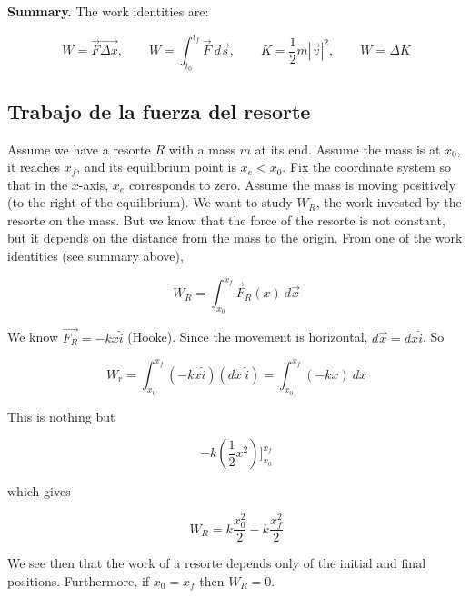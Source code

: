 \documentclass[12pt]{article}
\theoremstyle{definition}
\begin{document}
\begin{shaded}
    \textbf{Summary.} The work identities are:

    \begin{equation*}
        W = \vec{F} \vec{\Delta x}, \qquad W = \int_{t_0}^{t_f} \vec{F} ~ d\vec{s}, \qquad K = \frac{1}{2}m \left| \vec{v}
        \right|^2, \qquad W = \Delta K
    \end{equation*}
\end{shaded}

\subsection{Trabajo de la fuerza del resorte}

Assume we have a resorte $R$ with a mass $m$ at its end.  Assume the mass is at
$x_0$, it reaches $x_f$, and its equilibrium point is $x_e < x_0$. Fix the
coordinate system so that in the $x$-axis, $x_e$ corresponds to zero. Assume the
mass is moving positively (to the right of the equilibrium). We want to study
$W_R$, the work invested by the resorte on the mass. But we know that the force
of the resorte is not constant, but it depends on the distance from the mass to
the origin. From one of the work identities (see summary above),

\begin{equation*}
    W_R = \int_{x_0}^{x_f} \vec{F}_R(x) ~ d\vec{x}
\end{equation*}

We know $\vec{F_R} = -k x \hat{i}$ (Hooke). Since the movement is horizontal, 
$d \vec{x} = dx \hat{ i}$. So 

\begin{equation*}
    W_r = \int_{x_0}^{x_f}(- k x \hat{i}) (dx ~ \hat{i}) = \int_{x_0}^{x_f} (-k
    x) ~ dx
\end{equation*}

This is nothing but 

\begin{equation*}
-k \left( \frac{1}{2}x^2 \right)\Big]_{x_0}^{x_f}
\end{equation*}

which gives 

\begin{equation}
    W_R = k \frac{x_0^2}{2} - k \frac{x_f^2}{2}
\end{equation}

We see then that the work of a resorte depends only of the initial and final
positions. Furthermore, if $x_0 = x_f$ then $W_R = 0$.
\end{document}
